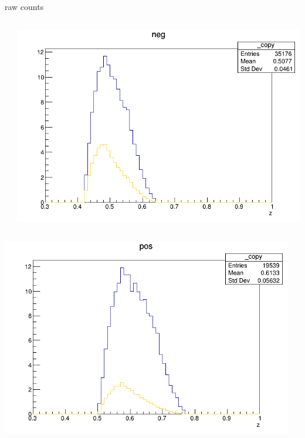 \begin{frame}{raw counts}
\begin{columns}
\begin{column}[T]{0.25\textwidth}
\end{column}
\begin{column}[T]{0.25\textwidth}
\includegraphics[width = \textwidth]{results/yield/statistics/yield_x_Q2_z_0.45_4.750_0.50_neg.png}
\end{column}
\end{columns}
\begin{columns}
\begin{column}[T]{0.25\textwidth}
\includegraphics[width = \textwidth]{results/yield/statistics/yield_x_Q2_z_0.45_4.750_0.60_pos.png}
\end{column}
\begin{column}[T]{0.25\textwidth}

\end{column}
\end{columns}
\end{frame}
